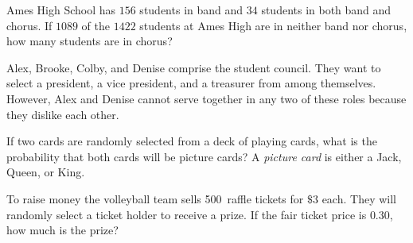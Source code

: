 \documentclass[addpoints,12pt]{exam}
\begin{document}
\begin{questions}

\question Ames High School has
$156$ students in band and $34$
students in both band and chorus.
If $1089$ of the $1422$ students at Ames High
are in neither band nor chorus, how many students
are in chorus?

\question[10] Alex, Brooke, Colby, and Denise comprise
the student council. They want to select a president,
a vice president, and a treasurer from among themselves.
However, Alex and Denise cannot serve together in any two
of these roles because they dislike each other.

\question[10] If two cards are randomly selected from a deck
of playing cards, what is the probability that both cards
will be picture cards?
A {\em picture card} is either a Jack, Queen, or King.

\question[10] To raise money the volleyball team sells 500~raffle tickets
for $\$3$ each. They will randomly select a ticket holder to receive
a prize. If the fair ticket price is $0.30$, how much is the prize?

\end{questions}

\vfill
\begin{center}\gradetable[h][questions]\end{center}
\end{document}
